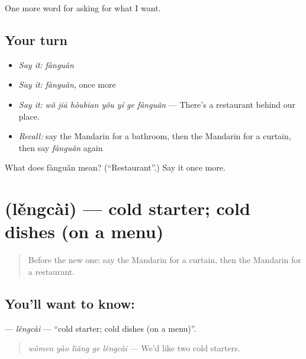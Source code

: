 \begin{grammarlens}[title={What you've built}]
One more word for asking for what I want.
\end{grammarlens}

\subsection*{Your turn}
\begin{itemize}
\raggedright
  \item \emph{Say it:} \emph{fànguǎn}
  \item \emph{Say it:} \emph{fànguǎn}, once more
  \item \emph{Say it:} \emph{wǒ jiā hòubian yǒu yí ge fànguǎn} — There's a restaurant behind our place.
  \item \emph{Recall:} say the Mandarin for a bathroom, then the Mandarin for a curtain, then say \emph{fànguǎn} again
\end{itemize}

\begin{tcolorbox}[breakable,colback=teal!4,colframe=teal!35!black,title={Before you move on}]
What does fànguǎn mean? (\textquotedblleft{}Restaurant\textquotedblright{}.) Say it once more.
\end{tcolorbox}
\section[\texorpdfstring{\zh{冷菜} (lěngcài)}{冷菜 (lěngcài)}]{ (lěngcài) — cold starter; cold dishes (on a menu)}

\label{lesson:ZH-C182-lengcai}



\begin{quote}
Before the new one: say the Mandarin for a curtain, then the Mandarin for a restaurant.
\end{quote}

\subsection*{You'll want to know: }
\textbf{} — \emph{lěngcài} — \textquotedblleft{}cold starter; cold dishes (on a menu)\textquotedblright{}.

\begin{quote}
\textbf{} \emph{wǒmen yào liǎng ge lěngcài} — We'd like two cold starters.
\end{quote}

